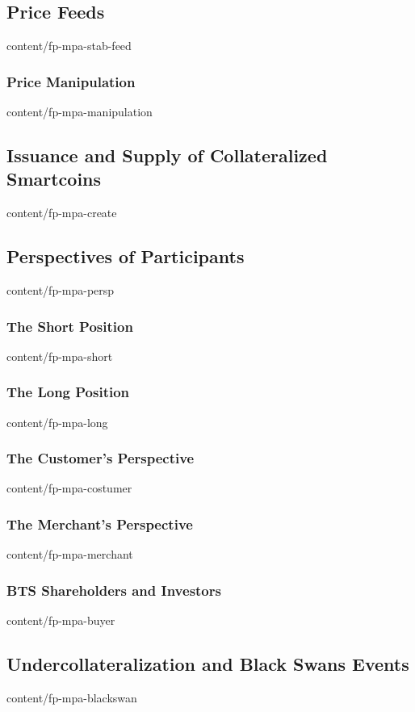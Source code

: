 \documentclass{btswhitepaper}
\begin{document}
\subsection     { Price Feeds                                      }  { content/fp-mpa-stab-feed       } 
\subsubsection  { Price Manipulation                               }  { content/fp-mpa-manipulation    } 
\subsection     { Issuance and Supply of Collateralized Smartcoins }  { content/fp-mpa-create          } 
\subsection     { Perspectives of Participants                     }  { content/fp-mpa-persp           } 
\subsubsection  { The Short Position                               }  { content/fp-mpa-short           } 
\subsubsection  { The Long Position                                }  { content/fp-mpa-long            } 
\subsubsection  { The Customer's Perspective                       }  { content/fp-mpa-costumer        } 
\subsubsection  { The Merchant's Perspective                       }  { content/fp-mpa-merchant        } 
\subsubsection  { BTS Shareholders and Investors                   }  { content/fp-mpa-buyer           } 
\subsection     { Undercollateralization and Black Swans Events    }  { content/fp-mpa-blackswan       } 
\end{document}
